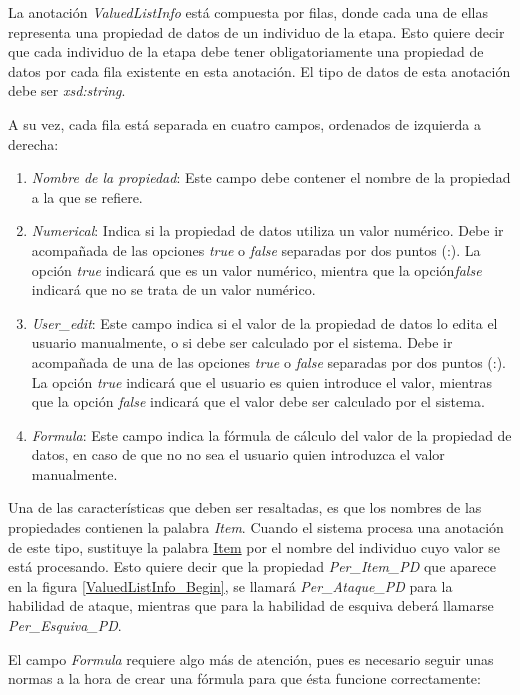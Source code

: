 La anotación \textit{ValuedListInfo} está compuesta por filas, donde cada una de ellas representa una propiedad de datos 
de un individuo de la etapa. Esto quiere decir que cada individuo de la etapa debe tener obligatoriamente una propiedad 
de datos por cada fila existente en esta anotación. El tipo de datos de esta anotación debe ser \textit{xsd:string}. \medskip

A su vez, cada fila está separada en cuatro campos, ordenados de izquierda a derecha:
\begin{enumerate}
    \item \textit{Nombre de la propiedad}: Este campo debe contener el nombre de la propiedad a la que se refiere.
    \item \textit{Numerical}: Indica si la propiedad de datos utiliza un valor numérico. Debe ir acompañada de las opciones 
    \textit{true} o \textit{false} separadas por dos puntos (:). La opción \textit{true} indicará que es un valor numérico, 
    mientra que la opción\textit{false} indicará que no se trata de un valor numérico.
    \item \textit{User\_edit}: Este campo indica si el valor de la propiedad de datos lo edita el usuario manualmente, o si 
    debe ser calculado por el sistema. Debe ir acompañada de una de las opciones \textit{true} o \textit{false} 
    separadas por dos puntos (:). La opción \textit{true} indicará que el usuario es quien introduce el valor, mientras que 
    la opción \textit{false} indicará que el valor debe ser calculado por el sistema.
    \item \textit{Formula}: Este campo indica la fórmula de cálculo del valor de la propiedad de datos, en caso de que no 
    no sea el usuario quien introduzca el valor manualmente.
\end{enumerate}\newpage

Una de las características que deben ser resaltadas, es que los nombres de las propiedades contienen la palabra \textit{Item}.
Cuando el sistema procesa una anotación de este tipo, sustituye la palabra \underline{Item} por el nombre del individuo cuyo valor se 
está procesando. Esto quiere decir que la propiedad \textit{Per\_Item\_PD} que aparece en la figura \ref*{ValuedListInfo_Begin}, 
se llamará \textit{Per\_Ataque\_PD} para la habilidad de ataque, mientras que para la habilidad de esquiva deberá llamarse 
\textit{Per\_Esquiva\_PD}. \medskip

El campo \textit{Formula} requiere algo más de atención, pues es necesario seguir unas normas a la hora de crear una fórmula 
para que ésta funcione correctamente:


